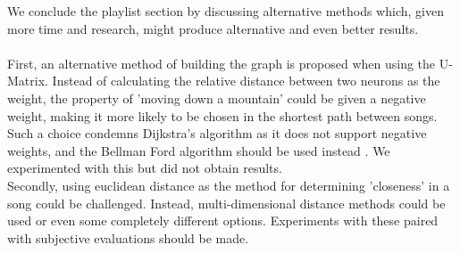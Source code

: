 We conclude the playlist section by discussing alternative methods which, given more time and research, might produce 
alternative and even better results. \\\\
First, an alternative method of building the graph is proposed when using the U-Matrix. Instead of calculating the relative distance between two neurons as the weight, the property of 'moving down a mountain' could be given a negative weight, making it more likely to be chosen in the shortest path between songs. Such a choice condemns Dijkstra's algorithm as it does not support negative weights, and the Bellman Ford algorithm should be used instead \citep{algs4}. We experimented with this but did not obtain results.\\
Secondly, using euclidean distance as the method for determining 'closeness' in a song could be challenged. Instead, multi-dimensional distance methods could be used or even some completely different options. Experiments with these paired with subjective evaluations should be made. \\




